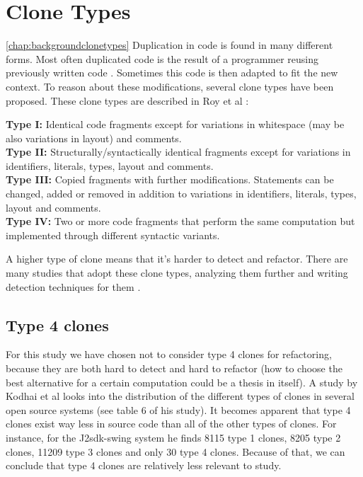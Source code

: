 \section{Clone Types} \ref{chap:backgroundclonetypes}
Duplication in code is found in many different forms. Most often duplicated code is the result of a programmer reusing previously written code \cite{haefliger2008code, baxter1998clone}. Sometimes this code is then adapted to fit the new context. To reason about these modifications, several clone types have been proposed. These clone types are described in Roy et al \cite{roy2007survey}:
\begin{displayquote}
\textbf{Type I:} Identical code fragments except for variations in whitespace (may be also variations in layout) and comments.\\
\textbf{Type II:} Structurally/syntactically identical fragments except for variations in identifiers, literals, types, layout and comments.\\
\textbf{Type III:} Copied fragments with further modifications. Statements can be changed, added or removed in addition to variations in identifiers, literals, types, layout and comments.\\
\textbf{Type IV:} Two or more code fragments that perform the same computation but implemented through different syntactic variants.
\end{displayquote}
A higher type of clone means that it's harder to detect and refactor. There are many studies that adopt these clone types, analyzing them further and writing detection techniques for them \cite{sajnani2016sourcerercc, kodhai2010detection, van2019novel}.

\subsection{Type 4 clones}
For this study we have chosen not to consider type 4 clones for refactoring, because they are both hard to detect and hard to refactor (how to choose the best alternative for a certain computation could be a thesis in itself). A study by Kodhai et al \cite{kodhai2013method} looks into the distribution of the different types of clones in several open source systems (see table 6 of his study). It becomes apparent that type 4 clones exist way less in source code than all of the other types of clones. For instance, for the J2sdk-swing system he finds 8115 type 1 clones, 8205 type 2 clones, 11209 type 3 clones and only 30 type 4 clones. Because of that, we can conclude that type 4 clones are relatively less relevant to study.

